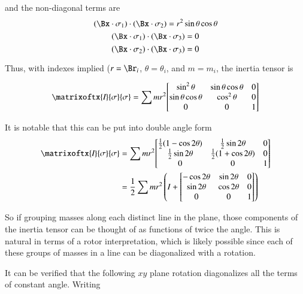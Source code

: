 and the non-diagonal terms are
\[
(\Bx \cdot \sigma_1) \cdot (\Bx \cdot \sigma_2) = r^2 \sin\theta \cos\theta
\]
\[
(\Bx \cdot \sigma_1) \cdot (\Bx \cdot \sigma_3) = 0
\]
\[
(\Bx \cdot \sigma_2) \cdot (\Bx \cdot \sigma_3) = 0
\]

Thus, with indexes implied ($r=\Br_i$, $\theta = \theta_i$, and $m = m_i$, the inertia tensor is

\begin{align*}
\matrixoftx{\emph{I}}{\sigma}{\sigma}
&= 
\sum m r^2
{
\begin{bmatrix}
\sin^2 \theta  & \sin\theta \cos \theta & 0 \\
\sin\theta \cos \theta & \cos^2 \theta & 0 \\
0 & 0 & 1 \\
\end{bmatrix}
} \\
\end{align*}

It is notable that this can be put into double angle form
\begin{align*}
\matrixoftx{\emph{I}}{\sigma}{\sigma}
&=
\sum 
m r^2
{
\begin{bmatrix}
\frac{1}{2} (1 - \cos 2\theta)    &   \frac{1}{2} \sin 2\theta      &     0 \\
\frac{1}{2} \sin 2\theta      &     \frac{1}{2}(1 + \cos 2\theta)    &    0 \\
0 & 0 & 1 \\
\end{bmatrix}
} \\
&=
\frac{1}{2} 
\sum 
m r^2
\left(
I + 
{
\begin{bmatrix}
- \cos 2\theta    &    \sin 2\theta     &    0 \\
\sin 2\theta      &     \cos 2\theta    &    0 \\
0 & 0 & 1 \\
\end{bmatrix}
}
\right) \\
\end{align*}

So if grouping masses along each distinct line in the plane, those components of the inertia tensor can be thought of as 
functions of twice the angle.  This is natural in terms of a rotor interpretation, which is likely possible since each of
these groups of masses in a line can be diagonalized with a rotation.

It can be verified that the following $xy$ plane rotation diagonalizes all the terms of constant angle.  Writing

